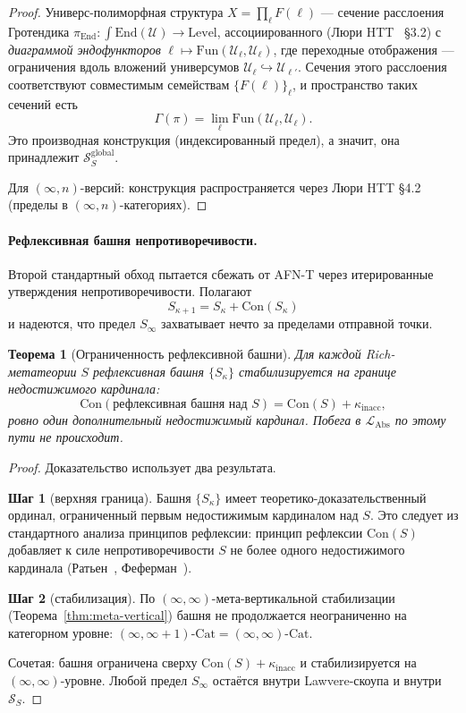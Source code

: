 \documentclass[11pt]{article}
\theoremstyle{plain}
\newtheorem{theorem}{Теорема}[section]
\theoremstyle{definition}
\newcommand{\cS}{\mathcal{S}}
\newcommand{\LAbs}{\mathcal{L}_{\mathrm{Abs}}}
\newcommand{\Fun}{\mathrm{Fun}}
\newcommand{\Cat}{\mathrm{Cat}}
\newcommand{\Con}{\mathrm{Con}}
\newcommand{\cU}{\mathcal{U}}
\begin{document}
\begin{proof}
Универс-полиморфная структура $X = \prod_\ell F(\ell)$ — сечение расслоения Гротендика $\pi_{\mathrm{End}} : \int \mathrm{End}(\cU) \to \mathrm{Level}$, ассоциированного (Люри HTT~\cite{LurieHTT} \S 3.2) с \emph{диаграммой эндофункторов} $\ell \mapsto \Fun(\cU_\ell, \cU_\ell)$, где переходные отображения — ограничения вдоль вложений универсумов $\cU_\ell \hookrightarrow \cU_{\ell'}$. Сечения этого расслоения соответствуют совместимым семействам $\{F(\ell)\}_\ell$, и пространство таких сечений есть
\[ \Gamma(\pi) = \lim_\ell \Fun(\cU_\ell, \cU_\ell). \]
Это производная конструкция (индексированный предел), а значит, она принадлежит $\cS_S^{\mathrm{global}}$.

Для $(\infty, n)$-версий: конструкция распространяется через Люри HTT \S 4.2 (пределы в $(\infty, n)$-категориях).
\end{proof}

\paragraph{Рефлексивная башня непротиворечивости.} Второй стандартный обход пытается сбежать от AFN-T через итерированные утверждения непротиворечивости. Полагают
\[ S_{\kappa+1} = S_\kappa + \Con(S_\kappa) \]
и надеются, что предел $S_\infty$ захватывает нечто за пределами отправной точки.

\begin{theorem}[Ограниченность рефлексивной башни]\label{thm:reflective}
Для каждой Rich-метатеории $S$ рефлексивная башня $\{S_\kappa\}$ стабилизируется на границе недостижимого кардинала:
\[ \Con(\text{рефлексивная башня над }S) = \Con(S) + \kappa_{\mathrm{inacc}}, \]
ровно один дополнительный недостижимый кардинал. Побега в $\LAbs$ по этому пути не происходит.
\end{theorem}

\begin{proof}
Доказательство использует два результата.

\textbf{Шаг 1} (верхняя граница). Башня $\{S_\kappa\}$ имеет теоретико-доказательственный ординал, ограниченный первым недостижимым кардиналом над $S$. Это следует из стандартного анализа принципов рефлексии: принцип рефлексии $\Con(S)$ добавляет к силе непротиворечивости $S$ не более одного недостижимого кардинала (Ратьен~\cite{Rathjen1999}, Феферман~\cite{Feferman1964}).

\textbf{Шаг 2} (стабилизация). По $(\infty, \infty)$-мета-вертикальной стабилизации (Теорема~\ref{thm:meta-vertical}) башня не продолжается неограниченно на категорном уровне: $(\infty, \infty + 1)\text{-}\Cat = (\infty, \infty)\text{-}\Cat$.

Сочетая: башня ограничена сверху $\Con(S) + \kappa_{\mathrm{inacc}}$ и стабилизируется на $(\infty, \infty)$-уровне. Любой предел $S_\infty$ остаётся внутри Lawvere-скоупа и внутри $\cS_S$.
\end{proof}
\end{document}
